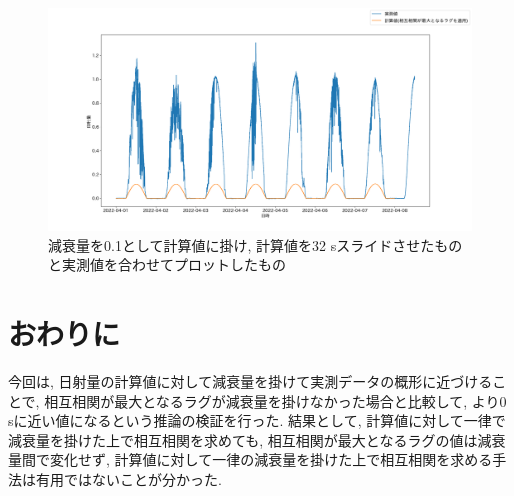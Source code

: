 \documentclass[a4j,12pt,]{jarticle}
\begin{document}
\begin{figure}[H]
  \begin{center}
    \includegraphics[width=160mm]{0.1.png}
    \caption{減衰量を0.1として計算値に掛け, 計算値を32 \si{\second}スライドさせたものと実測値を合わせてプロットしたもの}
    \label{p6}
  \end{center}
\end{figure}

\section{おわりに}
今回は, 日射量の計算値に対して減衰量を掛けて実測データの概形に近づけることで, 相互相関が最大となるラグが減衰量を掛けなかった場合と比較して, より0 \si{\second}に近い値になるという推論の検証を行った.
結果として, 計算値に対して一律で減衰量を掛けた上で相互相関を求めても, 相互相関が最大となるラグの値は減衰量間で変化せず, 計算値に対して一律の減衰量を掛けた上で相互相関を求める手法は有用ではないことが分かった.
\end{document}
